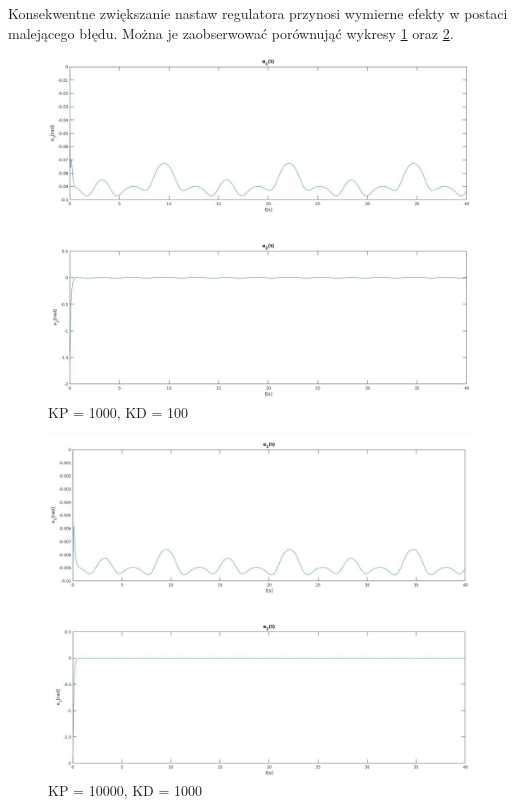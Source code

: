 \documentclass[12pt,a4paper]{article}
\begin{document}
    Konsekwentne zwiększanie nastaw regulatora przynosi wymierne efekty w postaci malejącego błędu. Można je zaobserwować porównująć wykresy \ref{fig:1000} oraz \ref{fig:10000}. 

  \begin{figure}[H]
    \centering
    \includegraphics[height=0.4\textheight]{figures/qui1000.jpg}
    \caption{KP = 1000, KD = 100}
    \label{fig:1000}
  \end{figure}


  \begin{figure}[H]
    \centering
    \includegraphics[height=0.4\textheight]{figures/qui10000.jpg}
    \caption{KP = 10000, KD = 1000}
    \label{fig:10000}
  \end{figure}
\end{document}
